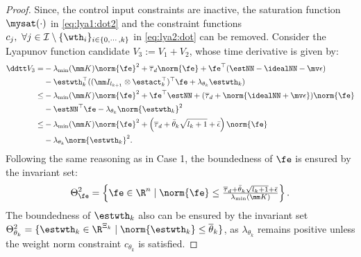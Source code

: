 \documentclass[journal]{IEEEtran}
\begin{document}
\begin{proof}
Since, the control input constraints are inactive, the saturation function $\mysat(\cdot)$ in \eqref{eq:lya1:dot2} and the constraint functions $c_j,\ \forall j\in\mathcal I \setminus \{\wth_i\}_{i\in\{0,\cdots,k\}}$ in \eqref{eq:lya2:dot} can be removed.
Consider the Lyapunov function candidate $V_3:=V_1+V_2$, whose time derivative is given by:
\begin{equation}
    \begin{aligned}
        \ddtt V_3
        =&
        -\lambda_{\min}(\mm K)\norm{\fe}^2
        +\overline\tau_d\norm{\fe}
        +\fe^\top (\estNN - \idealNN - \mv\epsilon)
        \\
        &
        -\estwth_k^\top (
            (\mm I_{l_{k+1}}\otimes \estact_k^\top)^\top
            \fe
            +
            \lambda_{\theta_k}\estwth_k
        )
        \\
        \le&
        -\lambda_{\min}(\mm K)\norm{\fe}^2
        +\fe^\top \estNN
        +(
            \overline\tau_d+\norm{
                \idealNN+\mv\epsilon
            }
        )
        \norm{\fe}
        \\
        &
        -\estNN^\top\fe 
        -\lambda_{\theta_k}\norm{\estwth_k}^2
        \\
        \le&
        -
        \lambda_{\min}(\mm K)
        \norm{\fe}^2
        +
        \left(
            \overline\tau_d
            +
            \bar{\theta}_k\sqrt{l_{k}+1}
            +
            \bar{\epsilon}
        \right)
        \norm{\fe}
        \\
        &
        -
        \lambda_{\theta_k}\norm{\estwth_k}^2
        .
    \end{aligned}
    \label{eq:lya3:dot}
\end{equation}
Following the same reasoning as in Case 1, the boundedness of $\fe$ is ensured by the invariant set:
\begin{equation}
    \Theta_{\fe}^{2}
    =
    \left\{ 
        \fe \in \R^n 
        \mid 
        \norm{\fe} 
        \le 
        \tfrac{
            \overline\tau_d
            +
            \bar{\theta}_k\sqrt{l_{k}+1}
            +
            \bar{\epsilon}
        }{
            \lambda_{\min}(\mm K)
        }
    \right\}
    .
\end{equation}
The boundedness of $\estwth_k$ also can be ensured by the invariant set $\Theta_{\theta_k}^{2}=\{ \estwth_k \in \R^{\Xi_{k}} \mid \norm{\estwth_k} \le \overline\theta_k \}$, as $\lambda_{\theta_k}$ remains positive unless the weight norm constraint $c_{\theta_k}$ is satisfied.


\end{proof}
\end{document}
